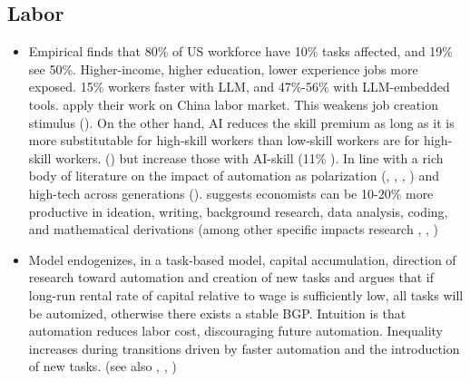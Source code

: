 \documentclass[10pt]{article} %
\begin{document}
    \subsection{Labor}
    \begin{itemize}
        \item Empirical\newline
        \cite{Eloundouetal2023} finds that 80\% of US workforce have 10\% tasks affected, and 19\% see 50\%. Higher-income, higher education, lower experience jobs more exposed. 15\% workers faster with LLM, and 47\%-56\% with LLM-embedded tools. \cite{Chenetal2023} apply their work on China labor market. This weakens job creation stimulus (\cite{EbekeEklou2023}).
        On the other hand, AI reduces the skill premium as long as it is more substitutable for high-skill workers than low-skill workers are for high-skill workers. (\cite{Bloometal2023}) but increase those with AI-skill (11\% \cite{Alekseevaetal2021}). 
        In line with a rich body of literature on the impact of automation as polarization (\cite{AutorLevyMurnane2003}, \cite{AutorKatzKearney2006}, \cite{VANREENEN2011},  \cite{BrynjolfssonLiRaymond2023})  and high-tech across generations (\cite{AdaoBerajaPandalaiNayar2020}). 
        \cite{Korinek2023} suggests economists can be 10-20\% more productive in ideation, writing, background research, data analysis, coding, and mathematical derivations (among other specific impacts research \cite{Feltenetal2023}, \cite{Bommasanietal2022}, \cite{Mollick2022})

        \item Model\newline
        \cite{AcemogluRestrepo2018} endogenizes, in a task-based model, capital accumulation, direction of research toward automation and creation of new tasks and argues that if long-run rental rate of capital relative to wage is sufficiently low, all tasks will be automized, otherwise there exists a stable BGP. Intuition is that automation reduces labor cost, discouraging future automation. Inequality increases during transitions driven by faster automation and the introduction of new tasks. (see also \cite{AcemogluAutor2011}, \cite{BassoJimeno2021}, \cite{AfonsoSequeiraAlmeida2023})
    \end{itemize}
\end{document}
